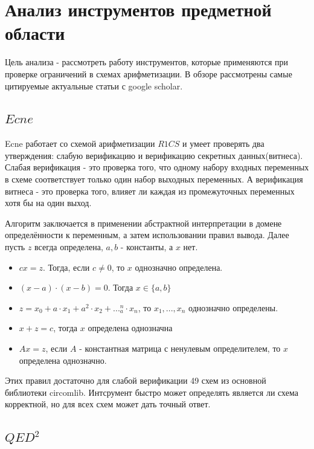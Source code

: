 \documentclass[a4paper]{article}
\begin{document}
\newpage
\section{Анализ инструментов предметной области}
\indent

Цель анализа - рассмотреть работу инструментов, которые применяются при проверке ограничений в схемах арифметизации. В обзоре рассмотрены самые цитируемые актуальные статьи с google scholar.

\subsection{$Ecne$}
\indent

Ecne работает со схемой арифметизации $R1CS$ и умеет проверять два утверждения: слабую верификацию и верификацию секретных данных(витнеса). Слабая верификация - это проверка того, что одному набору входных переменных в схеме соответствует только один набор выходных переменных. А верификация витнеса - это проверка того, влияет ли каждая из промежуточных переменных хотя бы на один выход.

Алгоритм заключается в применении абстрактной интерпретации в домене определённости к переменным, а затем использовании правил вывода. Далее пусть $z$ всегда определена, $a, b$ - константы, а $x$ нет.

\begin{itemize}
    \item $cx = z$. Тогда, если $c \neq 0$, то $x$ однозначно определена.
    \item $(x - a) \cdot (x - b) = 0$. Тогда $x \in \{a, b\}$
    \item $z = x_0 + a \cdot x_1 + a^2 \cdot x_2 + ... _ a^n \cdot x_n$, то $x_1, ..., x_n$ однозначно определены.
    \item $x + z = c$, тогда $x$ определена однозначна
    \item $Ax = z$, если $A$ - константная матрица с ненулевым определителем, то $x$ определена однозначно. 
\end{itemize}

Этих правил достаточно для слабой верификации 49 схем из основной библиотеки circomlib. Интсрумент быстро может определять является ли схема корректной, но для всех схем может дать точный ответ.

\subsection{$QED^2$}
\indent
\end{document}
